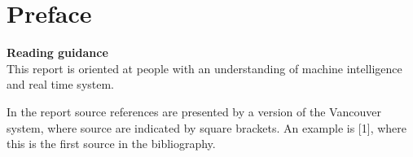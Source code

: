 \chapter*{Preface}

\textbf{Reading guidance}\\
This report is oriented at people with an understanding of machine intelligence and real time system. 

In the report source references are presented by a version of the Vancouver system, where source are indicated by square brackets. An example is [1], where this is the first source in the bibliography.


\begin{multicols}{2}
\signature{Martin Kristjansen}
\signature{Jonas S. Madsen}
\signature{Anders L. Matthiassen}
\signature{Lars Nielsen}
\signature{Simon Aagaard Pedersen}
\signature{Christian Stephansen}
\end{multicols}